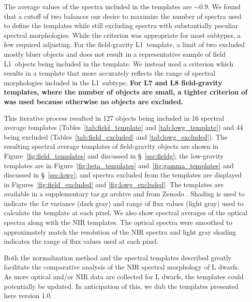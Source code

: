 \documentclass[modern]{aastex61}
\begin{document}
The average  values of the spectra included in the templates are $\sim0.9$.
We found that a  cutoff of two balances our desire to maximize the number of spectra used to define the templates while still excluding spectra with substantially peculiar spectral morphologies.
While the  criterion was appropriate for most subtypes, a few required adjusting.
For the field-gravity L1~template, a  limit of two excluded mostly bluer objects and does not result in a representative sample of field L1~objects being included in the template.
We instead used a  criterion which results in a template that more accurately reflects the range of spectral morphologies included in the L1~subtype.
\textbf{For L7 and L8 field-gravity templates, where the number of objects are small, a tighter criterion of  was used because otherwise no objects are excluded.}

This iterative process resulted in 127 objects being included in 16 spectral average templates (Tables~\ref{tab:field_template} and \ref{tab:lowg_template}) and 44 being excluded (Tables~\ref{tab:field_excluded} and \ref{tab:lowg_excluded}).
The resulting spectral average templates of field-gravity objects are shown in Figure~\ref{fig:field_templates} and discussed in \S~\ref{sec:fieldg}; the low-gravity templates are in Figure~\ref{fig:beta_templates} and~\ref{fig:gamma_templates} and discussed in \S~\ref{sec:lowg}; and spectra excluded from the templates are displayed in Figures~\ref{fig:field_excluded} and \ref{fig:lowg_excluded}.
The templates are available in a supplementary tar.gz archive and from Zenodo \citep{Cruz:2017kt}.
Shading is used to indicate the 1$\sigma$ variance (dark gray) and range of flux values (light gray) used to calculate the template at each pixel.
We also show spectral averages of the optical spectra along with the NIR templates. The optical spectra were smoothed to approximately match the resolution of the NIR spectra and light gray shading indicates the range of flux values used at each pixel.

Both the normalization method and the spectral templates described greatly facilitate the comparative analysis of the NIR spectral morphology of L dwarfs.
As more optical and/or NIR data are collected for L dwarfs, the templates could potentially be updated.
In anticipation of this, we dub the templates presented here version 1.0.
\end{document}
